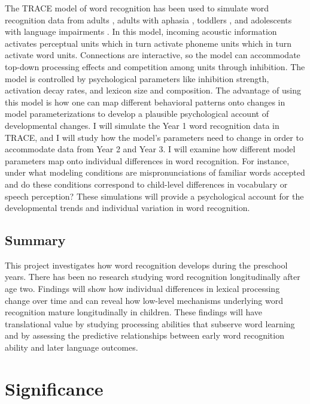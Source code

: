 \documentclass[]{book}
\theoremstyle{definition}
\theoremstyle{definition}
\theoremstyle{remark}
\begin{document}
The TRACE model of word recognition \citep{TRACE} has been used to
simulate word recognition data from adults \citep{Allopenna1998}, adults
with aphasia \citep{Mirman2011}, toddlers \citep{TRACE_Mispro}, and
adolescents with language impairments \citep{McMurray2010}. In this
model, incoming acoustic information activates perceptual units which in
turn activate phoneme units which in turn activate word units.
Connections are interactive, so the model can accommodate top-down
processing effects and competition among units through inhibition. The
model is controlled by psychological parameters like inhibition
strength, activation decay rates, and lexicon size and composition. The
advantage of using this model is how one can map different behavioral
patterns onto changes in model parameterizations to develop a plausible
psychological account of developmental changes. I will simulate the Year
1 word recognition data in TRACE, and I will study how the model's
parameters need to change in order to accommodate data from Year 2 and
Year 3. I will examine how different model parameters map onto
individual differences in word recognition. For instance, under what
modeling conditions are mispronunciations of familiar words accepted and
do these conditions correspond to child-level differences in vocabulary
or speech perception? These simulations will provide a psychological
account for the developmental trends and individual variation in word
recognition.

\section{Summary}\label{summary}

This project investigates how word recognition develops during the
preschool years. There has been no research studying word recognition
longitudinally after age two. Findings will show how individual
differences in lexical processing change over time and can reveal how
low-level mechanisms underlying word recognition mature longitudinally
in children. These findings will have translational value by studying
processing abilities that subserve word learning and by assessing the
predictive relationships between early word recognition ability and
later language outcomes.

\chapter{Significance}\label{significance}
\end{document}
